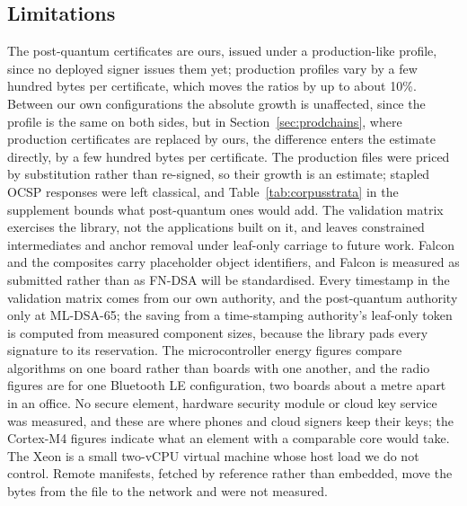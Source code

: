 \subsection{Limitations}
\label{sec:limitations}

The post-quantum certificates are ours, issued under a production-like
profile, since no deployed signer issues them yet; production profiles vary by
a few hundred bytes per certificate, which moves the ratios by up to about
10\%. Between our own configurations the absolute growth is unaffected, since
the profile is the same on both sides, but in Section~\ref{sec:prodchains},
where production certificates are replaced by ours, the difference enters the
estimate directly, by a few hundred bytes per certificate. The production files
were priced by substitution rather than re-signed, so their growth is an
estimate; stapled OCSP responses were left classical, and
Table~\ref{tab:corpusstrata} in the supplement bounds what post-quantum ones
would add. The validation matrix exercises the library, not the applications
built on it, and leaves constrained intermediates and anchor removal under
leaf-only carriage to future work. Falcon and the composites carry placeholder object identifiers, and
Falcon is measured as submitted rather than as FN-DSA will be standardised.
Every timestamp in the validation matrix comes from our own authority, and the
post-quantum authority only at ML-DSA-65; the saving from a time-stamping
authority's leaf-only token is computed from measured component sizes,
because the library pads every signature to its reservation. The microcontroller energy figures
compare algorithms on one board rather than boards with one another, and the
radio figures are for one Bluetooth LE configuration, two boards about a metre
apart in an office. No secure element, hardware security module or cloud key
service was measured, and these are where phones and cloud signers keep their
keys; the Cortex-M4 figures indicate what an element with a comparable core
would take. The Xeon is a small two-vCPU virtual machine whose host
load we do not control. Remote manifests, fetched by reference rather than
embedded, move the bytes from the file to the network and were not measured.
